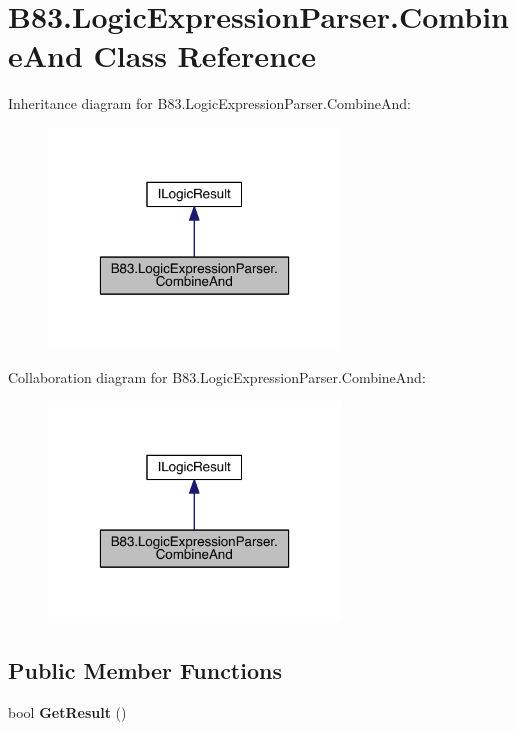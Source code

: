 \hypertarget{class_b83_1_1_logic_expression_parser_1_1_combine_and}{}\section{B83.\+Logic\+Expression\+Parser.\+Combine\+And Class Reference}
\label{class_b83_1_1_logic_expression_parser_1_1_combine_and}


Inheritance diagram for B83.\+Logic\+Expression\+Parser.\+Combine\+And\+:\nopagebreak
\begin{figure}[H]
\begin{center}
\leavevmode
\includegraphics[width=220pt]{class_b83_1_1_logic_expression_parser_1_1_combine_and__inherit__graph}
\end{center}
\end{figure}


Collaboration diagram for B83.\+Logic\+Expression\+Parser.\+Combine\+And\+:\nopagebreak
\begin{figure}[H]
\begin{center}
\leavevmode
\includegraphics[width=220pt]{class_b83_1_1_logic_expression_parser_1_1_combine_and__coll__graph}
\end{center}
\end{figure}
\subsection*{Public Member Functions}
\begin{DoxyCompactItemize}
\item 
bool {\bfseries Get\+Result} ()\hypertarget{class_b83_1_1_logic_expression_parser_1_1_combine_and_a23fd421aee4a42e3c478b5326325088a}{}\label{class_b83_1_1_logic_expression_parser_1_1_combine_and_a23fd421aee4a42e3c478b5326325088a}

\end{DoxyCompactItemize}
